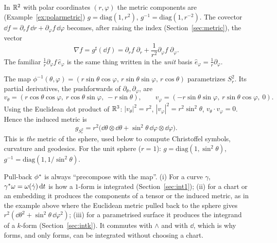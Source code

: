 \begin{example}
In $\mathbb{R}^2$ with polar coordinates $(r,\varphi)$ the metric components are (Example~\ref{ex:polarmetric}) $g=\mathrm{diag}(1,r^2)$, $g^{-1}=\mathrm{diag}(1,r^{-2})$. The covector $\dd f=\partial_rf\,\dd r+\partial_\varphi f\,\dd\varphi$ becomes, after raising the index (Section~\ref{sec:metric}), the vector
\[
\nabla f=g^\sharp(\dd f)=\partial_rf\;\partial_r+\frac{1}{r^2}\partial_\varphi f\;\partial_\varphi .
\]
The familiar $\frac1r\partial_\varphi f\,\hat e_\varphi$ is the same thing written in the \emph{unit} basis $\hat e_\varphi=\frac1r\partial_\varphi$.
\end{example}

\begin{example}
The map $\phi^{-1}(\theta,\varphi)=(r\sin\theta\cos\varphi,\,r\sin\theta\sin\varphi,\,r\cos\theta)$ parametrizes $S^2_r$. Its partial derivatives, \ie the pushforwards of $\partial_\theta,\partial_\varphi$, are
\[
v_\theta=(r\cos\theta\cos\varphi,\ r\cos\theta\sin\varphi,\ -r\sin\theta),\qquad
v_\varphi=(-r\sin\theta\sin\varphi,\ r\sin\theta\cos\varphi,\ 0).
\]
Using the Euclidean dot product of $\mathbb{R}^3$: $|v_\theta|^2=r^2$, $|v_\varphi|^2=r^2\sin^2\theta$, $v_\theta\cdot v_\varphi=0$. Hence the induced metric is
\[
g_{S^2_r}=r^2\big(\dd\theta\otimes\dd\theta+\sin^2\theta\,\dd\varphi\otimes\dd\varphi\big).
\]
This is \emph{the} metric of the sphere, used below to compute Christoffel symbols, curvature and geodesics. For the unit sphere ($r=1$): $g=\mathrm{diag}(1,\sin^2\theta)$, $g^{-1}=\mathrm{diag}(1,1/\sin^2\theta)$.
\end{example}


\begin{synthesis}
Pull-back $\phi{}^{*}$ is always ``precompose with the map''. (i) For a curve $\gamma$, $\gamma{}^{*}\omega=\omega(\dot\gamma)\,\mathrm{d} t$ is how a $1$-form is integrated (Section~\ref{sec:int1}); (ii) for a
chart or an embedding it produces the components of a tensor or the induced metric, as in the example above where the Euclidean metric pulled back to the sphere gives $r^2(\dd\theta^2+\sin^2\theta\,\dd\varphi^2)$; (iii) for a parametrised surface
it produces the integrand of a $k$-form (Section~\ref{sec:intk}). It commutes with $\wedge$ and with $\dd$, which is why forms, and only forms, can be integrated without choosing a chart.
\end{synthesis}
